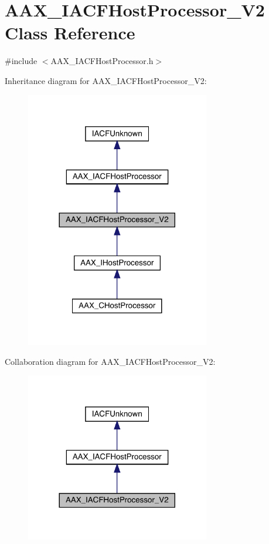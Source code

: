 \hypertarget{a01697}{}\section{A\+A\+X\+\_\+\+I\+A\+C\+F\+Host\+Processor\+\_\+\+V2 Class Reference}
\label{a01697}


{\ttfamily \#include $<$A\+A\+X\+\_\+\+I\+A\+C\+F\+Host\+Processor.\+h$>$}



Inheritance diagram for A\+A\+X\+\_\+\+I\+A\+C\+F\+Host\+Processor\+\_\+\+V2\+:
\nopagebreak
\begin{figure}[H]
\begin{center}
\leavevmode
\includegraphics[width=228pt]{a01696}
\end{center}
\end{figure}


Collaboration diagram for A\+A\+X\+\_\+\+I\+A\+C\+F\+Host\+Processor\+\_\+\+V2\+:
\nopagebreak
\begin{figure}[H]
\begin{center}
\leavevmode
\includegraphics[width=228pt]{a01695}
\end{center}
\end{figure}


